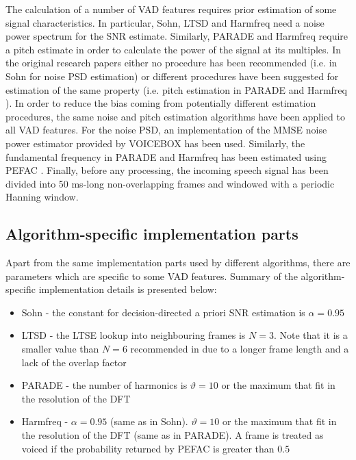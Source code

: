 The calculation of a number of VAD features requires prior estimation of some signal characteristics. In particular, Sohn, LTSD and Harmfreq need a noise power spectrum for the SNR estimate. Similarly, PARADE and Harmfreq require a pitch estimate in order to calculate the power of the signal at its multiples. In the original research papers either no procedure has been recommended (i.e. in Sohn \cite{Sohn} for noise PSD estimation) or different procedures have been suggested for estimation of the same property (i.e. pitch estimation in PARADE \cite{PARADE} and Harmfreq \cite{Tan}). In order to reduce the bias coming from potentially different estimation procedures, the same noise and pitch estimation algorithms have been applied to all VAD features. For the noise PSD, an implementation of the MMSE noise power estimator \cite{MMSEnoise} provided by VOICEBOX \cite{VOICEBOX} has been used. Similarly, the fundamental frequency in PARADE and Harmfreq has been estimated using PEFAC \cite{PEFAC}. Finally, before any processing, the incoming speech signal has been divided into 50 ms-long non-overlapping frames and windowed with a periodic Hanning window.

\subsection{Algorithm-specific implementation parts}

Apart from the same implementation parts used by different algorithms, there are parameters which are specific to some VAD features. Summary of the algorithm-specific implementation details is presented below:

\begin{itemize}
\item Sohn - the constant for decision-directed a priori SNR estimation is $\alpha = 0.95$
\item LTSD - the LTSE lookup into neighbouring frames is $N = 3$. Note that it is a smaller value than $N=6$ recommended in \cite{LTSD} due to a longer frame length and a lack of the overlap factor
\item PARADE - the number of harmonics is $\vartheta = 10$ or the maximum that fit in the resolution of the DFT
\item Harmfreq - $\alpha = 0.95$ (same as in Sohn). $\vartheta = 10$ or the maximum that fit in the resolution of the DFT (same as in PARADE). A frame is treated as voiced if the probability returned by PEFAC is greater than $0.5$
\end{itemize}

